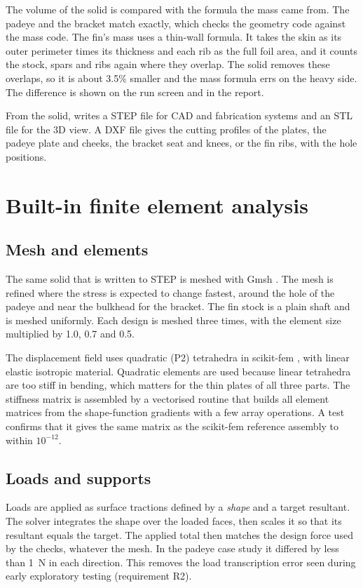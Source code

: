 The volume of the solid is compared with the formula the mass came from. The
padeye and the bracket match exactly, which checks the geometry code against
the mass code. The fin's mass uses a thin-wall formula. It takes the skin as
its outer perimeter times its thickness and each rib as the full foil area,
and it counts the stock, spars and ribs again where they overlap. The solid
removes these overlaps, so it is about 3.5\% smaller and the mass formula errs
on the heavy side. The difference is shown on the run screen and in the
report.

From the solid, \NEMO{} writes a STEP file for CAD and fabrication systems and
an STL file for the 3D view. A DXF file gives the cutting profiles of the
plates, the padeye plate and cheeks, the bracket seat and knees, or the fin
ribs, with the hole positions.

\section{Built-in finite element analysis}
\label{sec:fea}

\subsection{Mesh and elements}

The same solid that is written to STEP is meshed with Gmsh \cite{gmsh2009}.
The mesh is refined where the stress is expected to change fastest, around
the hole of the padeye and near the bulkhead for the bracket. The fin stock
is a plain shaft and is meshed uniformly. Each design is meshed three times,
with the element size multiplied by 1.0, 0.7 and 0.5.

The displacement field uses quadratic (P2) tetrahedra in scikit-fem
\cite{skfem2020}, with linear elastic isotropic material. Quadratic elements
are used because linear tetrahedra are too stiff in bending, which matters for
the thin plates of all three parts. The stiffness matrix is assembled by a
vectorised routine that builds all element matrices from the shape-function
gradients with a few array operations. A test confirms that it gives the same
matrix as the scikit-fem reference assembly to within $10^{-12}$.

\subsection{Loads and supports}

Loads are applied as surface tractions defined by a \emph{shape} and a target
resultant. The solver integrates the shape over the loaded faces, then scales
it so that its resultant equals the target. The applied total then matches
the design force used by the checks, whatever the mesh. In the padeye case
study it differed by less than 1~N in each direction. This removes the load
transcription error seen during early exploratory testing (requirement R2).


